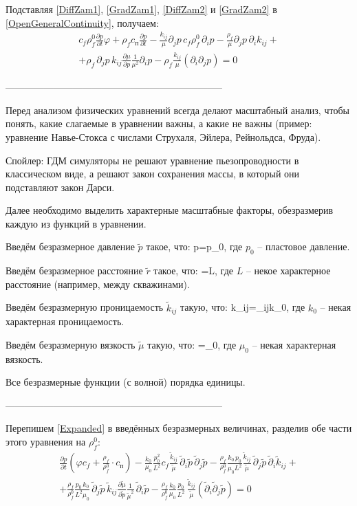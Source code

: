 \documentclass[main.tex]{subfiles}
\begin{document}
Подставляя \eqref{DiffZam1}, \eqref{GradZam1}, \eqref{DiffZam2} и \eqref{GradZam2} в \eqref{OpenGeneralContinuity}, получаем:
\begin{multline}\label{Expanded}
c_f\rho_f^0\frac{\partial p}{\partial t}\varphi+\rho_f c_\text{п}\frac{\partial p}{\partial t}-\frac{k_{ij}}{\mu}\partial_j p\,c_f\rho_f^0\,\partial_i p-\frac{\rho_f}{\mu}\partial_j p\,\partial_i k_{ij}+\\+\rho_f\,\partial_j p\,k_{ij}\frac{\partial\mu}{\partial p}\frac{1}{\mu^2}\partial_i p-\rho_f\frac{k_{ij}}{\mu}\left(\partial_i\partial_j p\right)=0
\end{multline}

--------------------------------------------------------------------

Перед анализом физических уравнений всегда делают масштабный анализ, чтобы понять, какие слагаемые в уравнении важны, а какие не важны (пример: уравнение Навье-Стокса с числами Струхаля, Эйлера, Рейнольдса, Фруда).

Спойлер: ГДМ симуляторы не решают уравнение пьезопроводности в классическом виде, а решают закон сохранения массы, в который они подставляют закон Дарси.

Далее необходимо выделить характерные масштабные факторы, обезразмерив каждую из функций в уравнении.

Введём безразмерное давление $\tilde{p}$ такое, что:
\beq
p=\cdot p_0,
\eeq
где $p_0$ -- пластовое давление.

Введём безразмерное расстояние $\tilde{r}$ такое, что:
\beq
{}=\cdot L,
\eeq
где $L$ -- некое характерное расстояние (например, между скважинами).

Введём безразмерную проницаемость $\tilde{k}_{ij}$ такую, что:
\beq
k_{ij}=_{ij}\cdot k_0,
\eeq
где $k_0$ -- некая характерная проницаемость.

Введём безразмерную вязкость $\tilde{\mu}$ такую, что:
\beq
\mu=\tilde{\mu}\cdot\mu_0,
\eeq
где $\mu_0$ -- некая характерная вязкость.

Все безразмерные функции (с волной) порядка единицы.

--------------------------------------------------------------------

Перепишем \eqref{Expanded} в введённых безразмерных величинах, разделив обе части этого уравнения на $\rho_f^0$:
\begin{multline}
\frac{\partial p}{\partial t}\left(\varphi c_f+\frac{\rho_f}{\rho_f^0}\cdot c_\text{п}\right)-\frac{k_0}{\mu_0}\frac{p_0^2}{L^2}c_f\frac{\tilde{k}_{ij}}{\tilde{\mu}}\,\tilde{\partial}_i\tilde{p}\,\tilde{\partial}_j\tilde{p}-\frac{\rho_f}{\rho_f^0}\frac{k_0\,p_0}{\mu_0L^2}\frac{\tilde{k}_{ij}}{\tilde{\mu}}\,\tilde{\partial}_j\tilde{p}\,\tilde{\partial}_i\tilde{k}_{ij}+\\+\frac{\rho_f}{\rho_f^0}\frac{p_0\,k_0}{L^2\mu_0}\,\tilde{\partial}_j\tilde{p}\,\tilde{k}_{ij}\frac{\partial\tilde{\mu}}{\partial\tilde{p}}\frac{1}{\tilde{\mu}^2}\,\tilde{\partial}_i\tilde{p}-\frac{\rho_f}{\rho_f^0}\frac{k_0}{\mu_0}\frac{p_0}{L^2}\,\frac{\tilde{k}_{ij}}{\tilde{\mu}}\left(\tilde{\partial}_i\tilde{\partial}_j\tilde{p}\right)=0
\end{multline}
\end{document}
